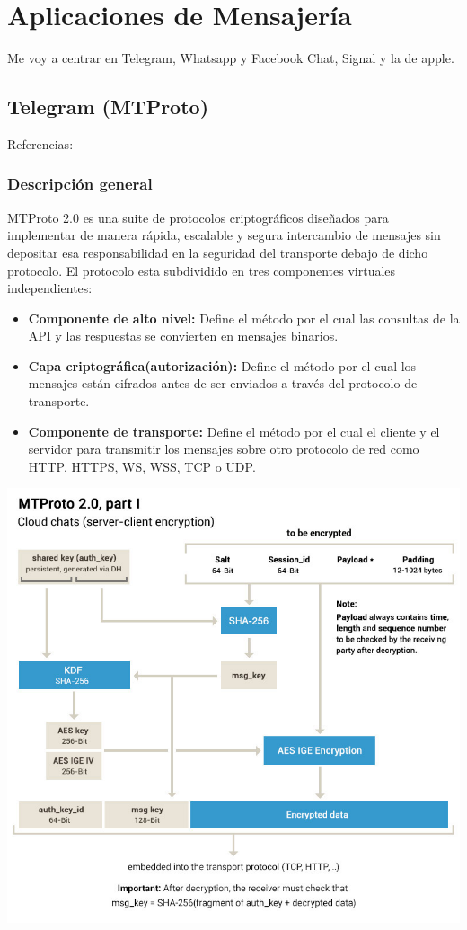 \chapter{Aplicaciones de Mensajería}

Me voy a centrar en Telegram, Whatsapp y Facebook Chat, Signal y la de apple.

\section{Telegram (MTProto)}

Referencias: \cite{Miculan2021} \cite{WebProto}

\subsection{Descripción general}
MTProto 2.0 es una suite de protocolos criptográficos diseñados para implementar de manera rápida, escalable y segura intercambio de mensajes sin depositar esa responsabilidad en la seguridad del transporte debajo de dicho protocolo.
El protocolo esta subdividido en tres componentes virtuales independientes:
\begin{itemize}
	\item \textbf{Componente de alto nivel:} Define el método por el cual las consultas de la API y las respuestas se convierten en mensajes binarios. 
	\item \textbf{Capa criptográfica(autorización):} Define el método por el cual los mensajes están cifrados antes de ser enviados a través del protocolo de transporte.
	\item \textbf{Componente de transporte:} Define el método por el cual el cliente y el servidor para transmitir los mensajes sobre otro protocolo de red como HTTP, HTTPS, WS, WSS, TCP o UDP.
\end{itemize}

\includegraphics[scale=0.4]{imagenes/diagramaMTProto.jpg} 

